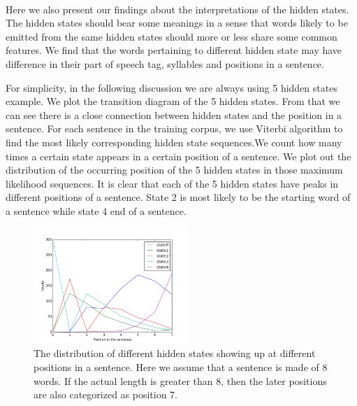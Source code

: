 \paragraph{} Here we also present our findings about the interpretations of the hidden states.
The hidden states should bear some meanings in a sense that words likely to be emitted from the same hidden states should more or less share some common features. We find that the words pertaining to different hidden state may have difference in their part of speech tag, syllables and positions in a sentence.

For simplicity, in the following discussion we are always using 5 hidden states example.  We plot the transition diagram of the 5 hidden states. From that we can see there is a close connection between hidden states and the position in a sentence.
For each sentence in the training corpus, we use Viterbi algorithm to find the most likely corresponding hidden state sequences.We count how many times a certain state appears in a certain position of a sentence.  We plot out the distribution of the occurring position of the 5 hidden states in those maximum likelihood sequences. 
It is clear that each of the 5 hidden states have peaks in different positions of a sentence. State 2 is most likely to be the starting word of a sentence while state 4 end of a sentence.
 \begin{figure}
 \includegraphics[width=0.52\textwidth]{./figure/hiddenstates_position_in_the_sentence.png}
 \caption{The distribution of different hidden states showing up at different positions in a sentence. Here we assume that a sentence is made of 8 words. If the actual length is greater than 8, then the later positions are also categorized as position 7.\label{fig:position}}
\end{figure}
\\
